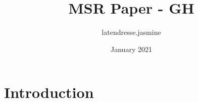\documentclass{article}
\title{MSR Paper - GH}
\author{latendresse.jasmine }
\date{January 2021}
\begin{document}
\maketitle

\section{Introduction}
\end{document}
